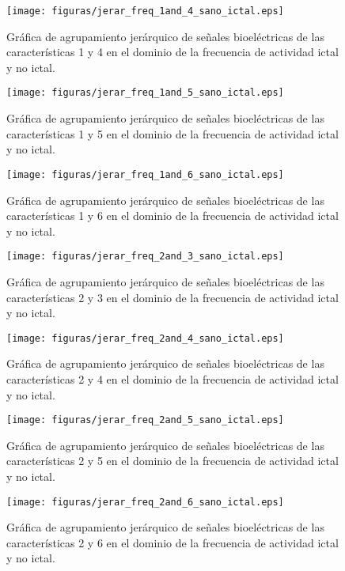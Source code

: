 \begin{figure}[H]
    \centering
    \texttt{[image: figuras/jerar\_freq\_1and\_4\_sano\_ictal.eps]}
    \caption{Gráfica de agrupamiento jerárquico de señales bioeléctricas de las características 1 y 4 en el dominio de la frecuencia de actividad ictal y no ictal.}
    \label{fig: jerar_freq_1_4}
\end{figure}
\begin{figure}[H]
    \centering
    \texttt{[image: figuras/jerar\_freq\_1and\_5\_sano\_ictal.eps]}
    \caption{Gráfica de agrupamiento jerárquico de señales bioeléctricas de las características 1 y 5 en el dominio de la frecuencia de actividad ictal y no ictal.}
    \label{fig: jerar_freq_1_5}
\end{figure}
\begin{figure}[H]
    \centering
    \texttt{[image: figuras/jerar\_freq\_1and\_6\_sano\_ictal.eps]}
    \caption{Gráfica de agrupamiento jerárquico de señales bioeléctricas de las características 1 y 6 en el dominio de la frecuencia de actividad ictal y no ictal.}
    \label{fig: jerar_freq_1_6}
\end{figure}
\begin{figure}[H]
    \centering
    \texttt{[image: figuras/jerar\_freq\_2and\_3\_sano\_ictal.eps]}
    \caption{Gráfica de agrupamiento jerárquico de señales bioeléctricas de las características 2 y 3 en el dominio de la frecuencia de actividad ictal y no ictal.}
    \label{fig: jerar_freq_2_3}
\end{figure}
\begin{figure}[H]
    \centering
    \texttt{[image: figuras/jerar\_freq\_2and\_4\_sano\_ictal.eps]}
    \caption{Gráfica de agrupamiento jerárquico de señales bioeléctricas de las características 2 y 4 en el dominio de la frecuencia de actividad ictal y no ictal.}
    \label{fig: jerar_freq_2_4}
\end{figure}
\begin{figure}[H]
    \centering
    \texttt{[image: figuras/jerar\_freq\_2and\_5\_sano\_ictal.eps]}
    \caption{Gráfica de agrupamiento jerárquico de señales bioeléctricas de las características 2 y 5 en el dominio de la frecuencia de actividad ictal y no ictal.}
    \label{fig: jerar_freq_2_5}
\end{figure}
\begin{figure}[H]
    \centering
    \texttt{[image: figuras/jerar\_freq\_2and\_6\_sano\_ictal.eps]}
    \caption{Gráfica de agrupamiento jerárquico de señales bioeléctricas de las características 2 y 6 en el dominio de la frecuencia de actividad ictal y no ictal.}
    \label{fig: jerar_freq_2_6}
\end{figure}

